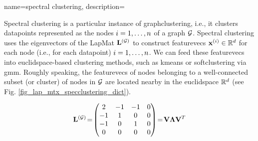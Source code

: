 {name={spectral clustering},
	description={Spectral \gls{clustering} is a particular instance of 
		\gls{graphclustering}, i.e., it clusters \gls{datapoint}s 
		represented as the nodes $i=1,\ldots,n$ of a \gls{graph} $\mathcal{G}$. 
		Spectral \gls{clustering} uses the \gls{eigenvector}s of the \gls{LapMat} ${\bf L}^{(\mathcal{G})}$ 
		to construct \gls{featurevec}s ${\bf x}^{(i)} \in \mathbb{R}^{d}$ 
		for each node (i.e., for each \gls{datapoint}) $i=1,\ldots,n$. We can feed these \gls{featurevec}s 
		into \gls{euclidspace}-based \gls{clustering} methods, such as \gls{kmeans} 
		or \gls{softclustering} via \gls{gmm}. Roughly speaking, the \gls{featurevec}s of nodes 
		belonging to a well-connected subset (or \gls{cluster}) of nodes in $\mathcal{G}$ are located 
		nearby in the \gls{euclidspace} $\mathbb{R}^{d}$ (see Fig. \ref{fig_lap_mtx_specclustering_dict}). 
		\begin{figure}[H]
			\begin{center}
				\begin{minipage}{0.4\textwidth}
				\end{minipage} 
				\hspace*{5mm}
				\begin{minipage}{0.4\textwidth}
					\begin{equation} 
						\LapMat{\graph}\!=\!
						\begin{pmatrix} 
							2 & -1 & -1 & 0 \\ 
							-1 & 1 & 0 & 0 \\  
							-1 & 0 & 1 & 0 \\ 
							0 & 0 & 0 & 0 
						\end{pmatrix}\!=\!\mathbf{V} {\bm \Lambda} \mathbf{V}^{T}  

\end{equation}
\end{minipage}
\end{center}
\end{figure}}}

